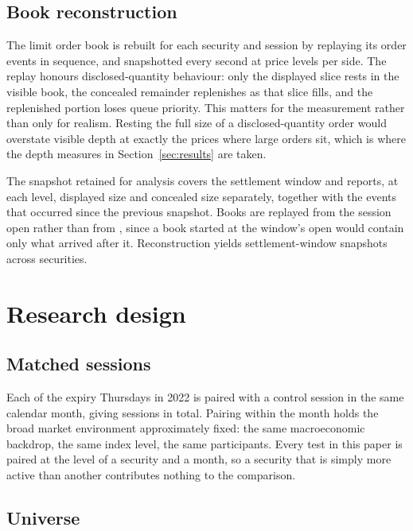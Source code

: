 \documentclass[11pt,a4paper]{article}
\begin{document}
\subsection{Book reconstruction}

The limit order book is rebuilt for each security and session by replaying its order events
in sequence, and snapshotted every \DesignSnapshotInterval{} second at \DesignBookLevels{}
price levels per side. The replay honours disclosed-quantity behaviour: only the displayed
slice rests in the visible book, the concealed remainder replenishes as that slice fills,
and the replenished portion loses queue priority. This matters for the measurement rather
than only for realism. Resting the full size of a disclosed-quantity order would overstate
visible depth at exactly the prices where large orders sit, which is where the depth
measures in Section~\ref{sec:results} are taken.

The snapshot retained for analysis covers the settlement window and reports, at each level,
displayed size and concealed size separately, together with the events that occurred since
the previous snapshot. Books are replayed from the session open rather than from
\DesignWindowStart{}, since a book started at the window's open would contain only what
arrived after it. Reconstruction yields \SampleSnapshots{} settlement-window snapshots across
\SampleSnapshotSymbols{} securities.


\section{Research design}\label{sec:design}

\subsection{Matched sessions}

Each of the \DesignExpirySessions{} expiry Thursdays in 2022 is paired with a control
session in the same calendar month, giving \DesignSessions{} sessions in total. Pairing
within the month holds the broad market environment approximately fixed: the same
macroeconomic backdrop, the same index level, the same participants. Every test in this
paper is paired at the level of a security and a month, so a security that is simply more
active than another contributes nothing to the comparison.

\subsection{Universe}
\end{document}
